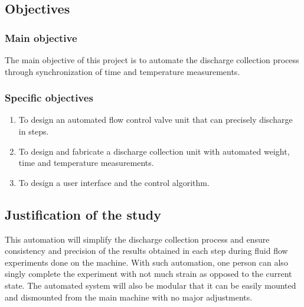 \subsection{Objectives}
\subsubsection{Main objective}

The main objective of this project is to automate the discharge collection process through synchronization of time and temperature measurements.

\subsubsection{Specific objectives}

\begin{enumerate}
	\item To design an automated flow control valve unit that can precisely discharge in steps.
	\item To design and fabricate a discharge collection unit with automated weight, time and temperature measurements.
    \item To design a user interface and the control algorithm.

\end{enumerate}


\subsection{Justification of the study}

This automation will simplify the discharge collection process and ensure consistency and precision of the results obtained in each step during fluid flow experiments done on the machine. With such automation, one person can also singly complete the experiment with not much strain as opposed to the current state. The automated system will also be modular that it can be easily mounted and dismounted from the main machine with no major adjustments.